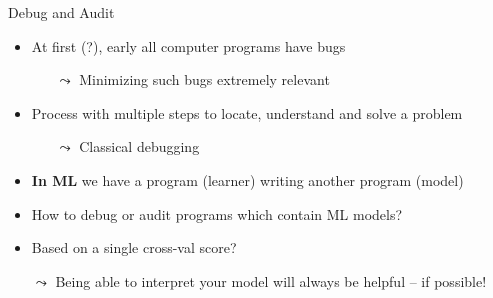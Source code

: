 \documentclass[11pt,compress,t,notes=noshow, aspectratio=169, xcolor=table]{beamer}
\begin{document}
\begin{frame}{Debug and Audit}
    \begin{itemize}
        \item At first (?), early all computer programs have bugs
        \begin{itemize}
            \item[$\leadsto$] Minimizing such bugs extremely relevant
        \end{itemize}
        \item Process with multiple steps to locate, understand and solve a problem
        \begin{itemize}
            \item[$\leadsto$] Classical debugging
        \end{itemize}
        \item \textbf{In ML} we have a program (learner) writing another program (model)
        \item How to debug or audit programs which contain ML models? 
        \item Based on a single cross-val score?
            \item[$\leadsto$] Being able to interpret your model will always be helpful -- if possible!
    \end{itemize}
\end{frame}



\end{document}
